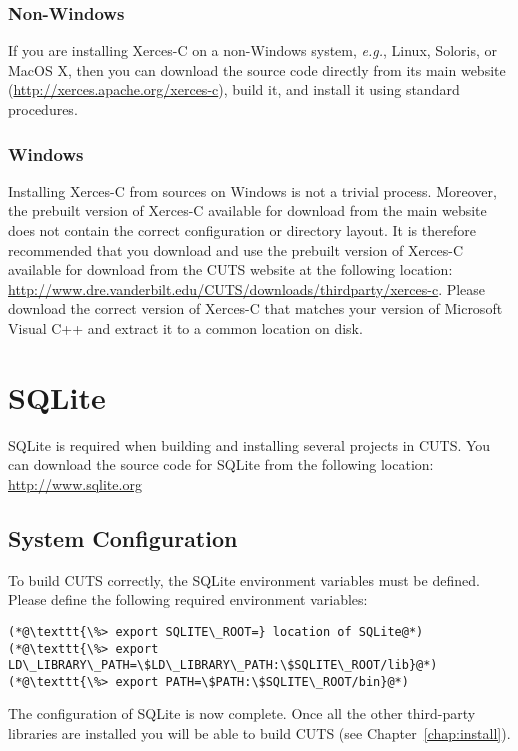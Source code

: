 \subsubsection{Non-Windows}
 
If you are installing Xerces-C on a non-Windows system, \textit{e.g.}, Linux, 
Soloris, or MacOS X, then you can download the source code directly from its
main website (\url{http://xerces.apache.org/xerces-c}), build it, and install it using 
standard procedures.

\subsubsection{Windows}

Installing Xerces-C from sources on Windows is not a trivial process. 
Moreover, the prebuilt version of Xerces-C available for download from 
the main website does not contain the correct configuration or directory
layout. It is therefore recommended that you download and use the prebuilt 
version of Xerces-C available for download from the CUTS website at the 
following location:
\url{http://www.dre.vanderbilt.edu/CUTS/downloads/thirdparty/xerces-c}. Please download
the correct version of Xerces-C that matches your version of Microsoft Visual
C++ and extract it to a common location on disk.

\section{SQLite}
\label{sec:thirdparty-sqlite}

SQLite is required when building and installing several 
projects in CUTS. You can download the source code for SQLite
from the following location: \url{http://www.sqlite.org}

\subsection{System Configuration}

To build CUTS correctly, the SQLite environment variables must be defined. Please 
define the following required environment variables:
\begin{lstlisting}
(*@\texttt{\%> export SQLITE\_ROOT=} location of SQLite@*)
(*@\texttt{\%> export LD\_LIBRARY\_PATH=\$LD\_LIBRARY\_PATH:\$SQLITE\_ROOT/lib}@*)
(*@\texttt{\%> export PATH=\$PATH:\$SQLITE\_ROOT/bin}@*)
\end{lstlisting}
The configuration of SQLite is now complete. Once all the other
third-party libraries are installed you will be able to build CUTS
(see Chapter~\ref{chap:install}).

